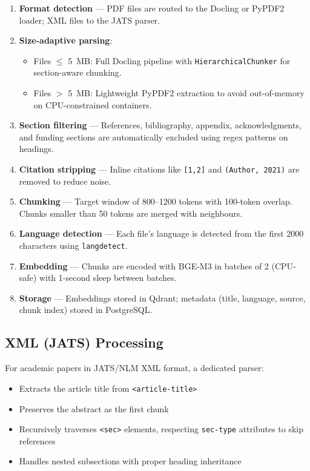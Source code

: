 \documentclass[12pt, a4paper]{article}
\begin{document}
\begin{enumerate}[leftmargin=2em]
  \item \textbf{Format detection} --- PDF files are routed to the Docling
        or PyPDF2 loader; XML files to the JATS parser.
  \item \textbf{Size-adaptive parsing}:
    \begin{itemize}
      \item Files $\leq$ 5~MB: Full Docling pipeline with
            \texttt{HierarchicalChunker} for section-aware chunking.
      \item Files $>$ 5~MB: Lightweight PyPDF2 extraction to avoid
            out-of-memory on CPU-constrained containers.
    \end{itemize}
  \item \textbf{Section filtering} --- References, bibliography, appendix,
        acknowledgments, and funding sections are automatically excluded
        using regex patterns on headings.
  \item \textbf{Citation stripping} --- Inline citations like \texttt{[1,2]}
        and \texttt{(Author, 2021)} are removed to reduce noise.
  \item \textbf{Chunking} --- Target window of 800--1200 tokens with 100-token
        overlap. Chunks smaller than 50 tokens are merged with neighbours.
  \item \textbf{Language detection} --- Each file's language is detected from
        the first 2000 characters using \texttt{langdetect}.
  \item \textbf{Embedding} --- Chunks are encoded with BGE-M3 in batches of 2
        (CPU-safe) with 1-second sleep between batches.
  \item \textbf{Storage} --- Embeddings stored in Qdrant; metadata (title,
        language, source, chunk index) stored in PostgreSQL.
\end{enumerate}

\subsection{XML (JATS) Processing}

For academic papers in JATS/NLM XML format, a dedicated parser:
\begin{itemize}[leftmargin=2em]
  \item Extracts the article title from \texttt{<article-title>}
  \item Preserves the abstract as the first chunk
  \item Recursively traverses \texttt{<sec>} elements, respecting
        \texttt{sec-type} attributes to skip references
  \item Handles nested subsections with proper heading inheritance
\end{itemize}
\end{document}

